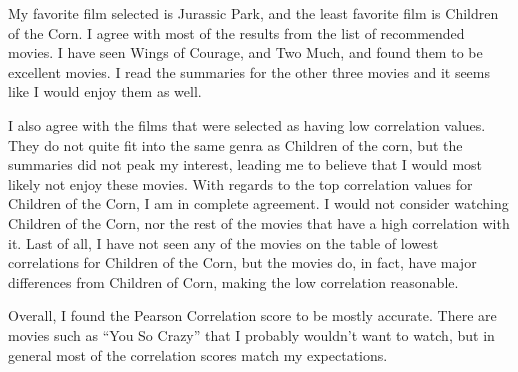 \documentclass[11pt]{scrartcl} %
\begin{document}
\tabto{2.0cm} My favorite film selected is Jurassic Park, and the least favorite film is Children of the Corn. I agree with most of the results from the list of recommended movies. I have seen Wings of Courage, and Two Much, and found them to be excellent movies. I read the summaries for the other three movies and it seems like I would enjoy them as well. \newline \newline

\tabto{2.0cm} I also agree with the films that were selected as having low correlation values. They do not quite fit into the same genra as Children of the corn, but the summaries did not peak my interest, leading me to believe that I would most likely not enjoy these movies. With regards to the top correlation values for Children of the Corn, I am in complete agreement. I would not consider watching Children of the Corn, nor the rest of the movies that have a high correlation with it. Last of all, I have not seen any of the movies on the table of lowest correlations for Children of the Corn, but the movies do, in fact, have major differences from Children of Corn, making the low correlation reasonable. \newline

\tabto{2.0cm} Overall, I found the Pearson Correlation score to be mostly accurate. There are movies such as ``You So Crazy'' that I probably wouldn't want to watch, but in general most of the correlation scores match my expectations.
\end{document}
